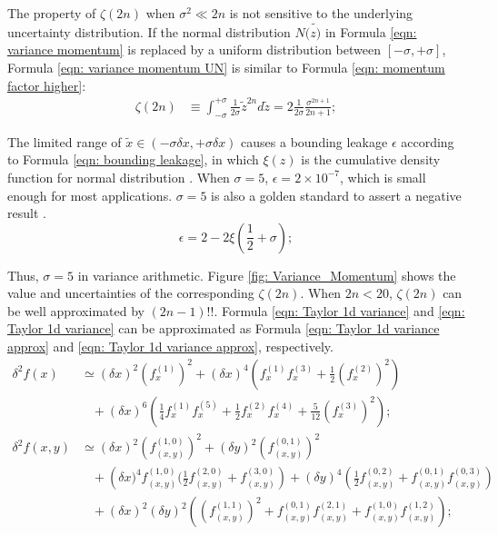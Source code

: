 \documentclass[twoside]{article}
\numberwithin{equation}{section}
\newcommand{\eqspace}{\;\;\;}
\begin{document}
The property of $\zeta(2n)$ when $\sigma^2 \ll 2n$ is not sensitive to the underlying uncertainty distribution.  If the normal distribution $N(\tilde{z)}$ in Formula \eqref{eqn: variance momentum} is replaced by a uniform distribution between $[-\sigma, +\sigma]$,  Formula \eqref{eqn: variance momentum UN} is similar to Formula \eqref{eqn: momentum factor higher}:
\begin{align}
\label{eqn: variance momentum UN}
\zeta(2n) &\equiv \int_{-\sigma}^{+\sigma} \frac{1}{2 \sigma} \tilde{z}^{2n} d \tilde{z} = 2 \frac{1}{2 \sigma} \frac{{\sigma}^{2n+1}}{2n + 1}; 
\end{align}

The limited range of $\tilde{x} \in (-\sigma \delta x, +\sigma \delta x)$ causes a bounding leakage $\epsilon$ according to Formula \eqref{eqn: bounding leakage}, in which $\xi(z)$ is the cumulative density function for normal distribution \cite{Probability_Statistics}.
When $\sigma = 5$, $\epsilon = 2 \times 10^{-7}$, which is small enough for most applications.
$\sigma = 5$ is also a golden standard to assert a negative result \cite{Precisions_Physical_Measurements}.
\begin{equation}
\label{eqn: bounding leakage}
\epsilon = 2 - 2 \xi(\frac{1}{2} + \sigma);
\end{equation}

Thus, $\sigma = 5$ in variance arithmetic.  
Figure \ref{fig: Variance_Momentum} shows the value and uncertainties of the corresponding $\zeta(2n)$.
When $2n < 20$, $\zeta(2n)$ can be well approximated by $(2n -1)!!$.  
Formula \eqref{eqn: Taylor 1d variance} and \eqref{eqn: Taylor 1d variance} can be approximated as Formula \eqref{eqn: Taylor 1d variance approx} and \eqref{eqn: Taylor 1d variance approx}, respectively.
\begin{align}
\label{eqn: Taylor 1d variance approx}
\delta^2 f(x) &\simeq (\delta x)^2 (f^{(1)}_x)^2 + (\delta x)^4 \left(f^{(1)}_x f^{(3)}_x + \frac{1}{2} (f^{(2)}_x)^2 \right) \\
  &\eqspace + (\delta x)^6 \left(\frac{1}{4} f^{(1)}_x f^{(5)}_x + \frac{1}{2} f^{(2)}_x f^{(4)}_x + \frac{5}{12} (f^{(3)}_x)^2 \right); \nonumber \\
\label{eqn: Taylor 2d variance approx}
\delta^2 f(x, y)&\simeq (\delta x)^2 (f^{(1,0)}_{(x,y)})^2 + (\delta y)^2 (f^{(0,1)}_{(x,y)})^2 \\
&\eqspace + \left(\delta x)^4 f^{(1,0)}_{(x,y)} (\frac{1}{2} f^{(2,0)}_{(x,y)} + f^{(3,0)}_{(x,y)}\right)
      + (\delta y)^4 \left(\frac{1}{2} f^{(0,2)}_{(x,y)} + f^{(0,1)}_{(x,y)} f^{(0,3)}_{(x,y)}\right) \nonumber \\
&\eqspace + (\delta x)^2 (\delta y)^2 \left((f^{(1,1)}_{(x,y)})^2 + f^{(0,1)}_{(x,y)} f^{(2,1)}_{(x,y)} + f^{(1,0)}_{(x,y)} f^{(1,2)}_{(x,y)}\right); \nonumber
\end{align}
\end{document}
